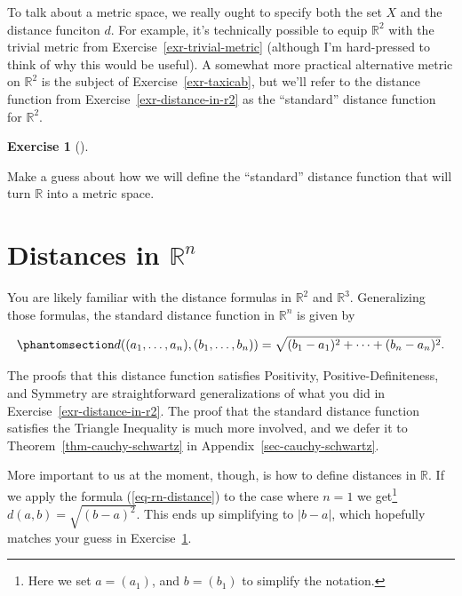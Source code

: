 \documentclass[
  letterpaper,
  DIV=11,
  numbers=noendperiod]{scrreprt}
\def\R{\mathbb R}
\theoremstyle{plain}
\theoremstyle{definition}
\newtheorem{exercise}{Exercise}[chapter]
\theoremstyle{plain}
\theoremstyle{plain}
\theoremstyle{definition}
\theoremstyle{definition}
\theoremstyle{remark}
\begin{document}
To talk about a metric space, we really ought to specify both the set
\(X\) and the distance funciton \(d\). For example, it's technically
possible to equip \(\R^2\) with the trivial metric from
Exercise~\ref{exr-trivial-metric} (although I'm hard-pressed to think of
why this would be useful). A somewhat more practical alternative metric
on \(\R^2\) is the subject of Exercise~\ref{exr-taxicab}, but we'll
refer to the distance function from Exercise~\ref{exr-distance-in-r2} as
the ``standard'' distance function for \(\R^2\).

\begin{exercise}[]\protect\hypertarget{exr-metric-on-r-guess}{}\label{exr-metric-on-r-guess}

Make a guess about how we will define the ``standard'' distance function
that will turn \(\R\) into a metric space.

\end{exercise}

\section{\texorpdfstring{Distances in
\(\R^n\)}{Distances in \textbackslash R\^{}n}}\label{distances-in-rn}

You are likely familiar with the distance formulas in \(\R^2\) and
\(\R^3\). Generalizing those formulas, the standard distance function in
\(\R^n\) is given by

\begin{equation}\phantomsection\label{eq-rn-distance}{d((a_1,\ldots,a_n),(b_1,\ldots,b_n))=\sqrt{(b_1-a_1)^2+\cdots+(b_n-a_n)^2}.}\end{equation}

The proofs that this distance function satisfies Positivity,
Positive-Definiteness, and Symmetry are straightforward generalizations
of what you did in Exercise~\ref{exr-distance-in-r2}. The proof that the
standard distance function satisfies the Triangle Inequality is much
more involved, and we defer it to Theorem~\ref{thm-cauchy-schwartz} in
Appendix~\ref{sec-cauchy-schwartz}.

More important to us at the moment, though, is how to define distances
in \(\R\). If we apply the formula (\ref{eq-rn-distance}) to the case
where \(n=1\) we get\footnote{Here we set \(a=(a_1)\), and \(b=(b_1)\)
  to simplify the notation.} \(d(a,b)=\sqrt{(b-a)^2}\). This ends up
simplifying to \(|b-a|\), which hopefully matches your guess in
Exercise~\ref{exr-metric-on-r-guess}.
\end{document}
